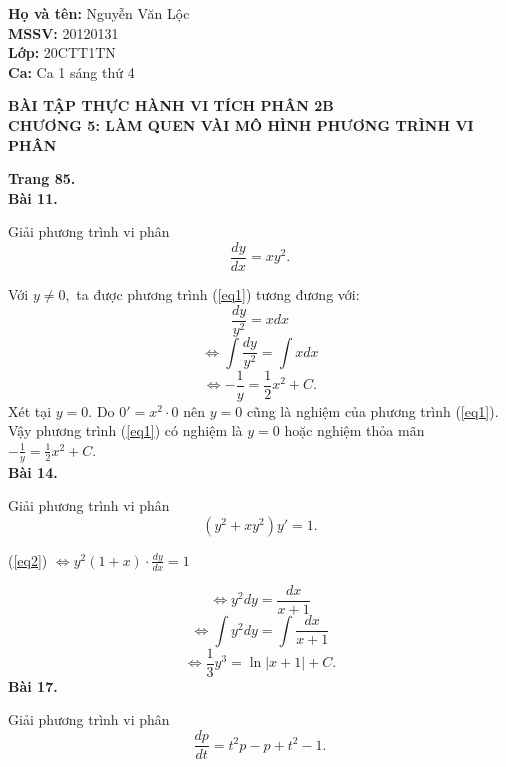 \documentclass[12pt,a4paper]{article}
\author{Nguyễn Văn Lộc}
\begin{document}
\fancyhf{}
\lhead{}
\chead{}
\rhead{}
\cfoot{\thepage}
\rfoot{}
\lfoot{}
\pagestyle{fancy}
\renewcommand{\headrulewidth}{0pt}
\renewcommand{\footrulewidth}{0pt}
\begin{flushleft}
	\begin{mybox}
	\textbf{Họ và tên:} Nguyễn Văn Lộc\\
	\textbf{MSSV:} 20120131\\ 
	\textbf{Lớp:} 20CTT1TN\\
	\textbf{Ca:} Ca 1 sáng thứ 4
	\end{mybox}
\end{flushleft}
\begin{center}
	\textbf{BÀI TẬP THỰC HÀNH VI TÍCH PHÂN 2B}\\
	\textbf{CHƯƠNG 5: LÀM QUEN VÀI MÔ HÌNH PHƯƠNG TRÌNH VI PHÂN}
\end{center}
\textbf{Trang 85.}\\
\textbf{Bài 11.}
\begin{mybox}
Giải phương trình vi phân 
\begin{equation}
\frac{{dy}}{{dx}} = x{y^2}.
\label{eq1}
\end{equation}
\end{mybox}
Với \(y \ne 0,\) ta được phương trình (\ref{eq1}) tương đương với:
\[\frac{{dy}}{{{y^2}}} = xdx\]
\[ \Leftrightarrow \int {\frac{{dy}}{{{y^2}}} = \int {xdx} } \]
\[ \Leftrightarrow  - \frac{1}{y} = \frac{1}{2}{x^2} + C.\]
Xét tại \(y = 0.\) Do \(0' = {x^2} \cdot 0\) nên \(y = 0\) cũng là nghiệm của phương trình (\ref{eq1}).\\
Vậy phương trình (\ref{eq1}) có nghiệm là \(y = 0\) hoặc nghiệm thỏa mãn \(  - \frac{1}{y} = \frac{1}{2}{x^2} + C.\)\\
\textbf{Bài 14.}
\begin{mybox}
Giải phương trình vi phân
\begin{equation}
\left( {{y^2} + x{y^2}} \right)y' = 1.
\label{eq2}
\end{equation}
\end{mybox}
\begin{center}
(\ref{eq2}) \( \Leftrightarrow {y^2}\left( {1 + x} \right) \cdot \frac{{dy}}{{dx}} = 1\)
\end{center}
\[ \Leftrightarrow {y^2}dy = \frac{{dx}}{{x + 1}}\]
\[ \Leftrightarrow \int {{y^2}dy}  = \int {\frac{{dx}}{{x + 1}}} \]
\[ \Leftrightarrow \frac{1}{3}{y^3} = \ln \left| {x + 1} \right| + C.\]
\textbf{Bài 17.}
\begin{mybox}
Giải phương trình vi phân 
\begin{equation}
\frac{{dp}}{{dt}} = {t^2}p - p + {t^2} - 1.
\label{eq3}
\end{equation}
\end{mybox}
\end{document}
